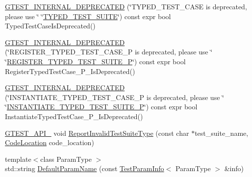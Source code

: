 \begin{DoxyCompactItemize}
\item 
\mbox{\hyperlink{namespacetesting_1_1internal_ac7c25a00ce37b8f6c7ea16814233b281}{G\+T\+E\+S\+T\+\_\+\+I\+N\+T\+E\+R\+N\+A\+L\+\_\+\+D\+E\+P\+R\+E\+C\+A\+T\+ED}} (\char`\"{}T\+Y\+P\+E\+D\+\_\+\+T\+E\+S\+T\+\_\+\+C\+A\+SE is deprecated, please use \char`\"{} \char`\"{}\mbox{\hyperlink{namespacetesting_a47a357ed1077c1b52ba654b7753714bc}{T\+Y\+P\+E\+D\+\_\+\+T\+E\+S\+T\+\_\+\+S\+U\+I\+TE}}\char`\"{}) const expr bool Typed\+Test\+Case\+Is\+Deprecated()
\item 
\mbox{\hyperlink{namespacetesting_1_1internal_ad10c37bd148fb8988a1d99e127891203}{G\+T\+E\+S\+T\+\_\+\+I\+N\+T\+E\+R\+N\+A\+L\+\_\+\+D\+E\+P\+R\+E\+C\+A\+T\+ED}} (\char`\"{}R\+E\+G\+I\+S\+T\+E\+R\+\_\+\+T\+Y\+P\+E\+D\+\_\+\+T\+E\+S\+T\+\_\+\+C\+A\+S\+E\+\_\+P is deprecated, please use \char`\"{} \char`\"{}\mbox{\hyperlink{namespacetesting_ac025be5150f4d250cfd8136063e2f2a1}{R\+E\+G\+I\+S\+T\+E\+R\+\_\+\+T\+Y\+P\+E\+D\+\_\+\+T\+E\+S\+T\+\_\+\+S\+U\+I\+T\+E\+\_\+P}}\char`\"{}) const expr bool Register\+Typed\+Test\+Case\+\_\+\+P\+\_\+\+Is\+Deprecated()
\item 
\mbox{\hyperlink{namespacetesting_1_1internal_ab9dabaaecfb36c469b3382a169a581db}{G\+T\+E\+S\+T\+\_\+\+I\+N\+T\+E\+R\+N\+A\+L\+\_\+\+D\+E\+P\+R\+E\+C\+A\+T\+ED}} (\char`\"{}I\+N\+S\+T\+A\+N\+T\+I\+A\+T\+E\+\_\+\+T\+Y\+P\+E\+D\+\_\+\+T\+E\+S\+T\+\_\+\+C\+A\+S\+E\+\_\+P is deprecated, please use \char`\"{} \char`\"{}\mbox{\hyperlink{namespacetesting_abc73aa914fde88c645367f862dbe81dd}{I\+N\+S\+T\+A\+N\+T\+I\+A\+T\+E\+\_\+\+T\+Y\+P\+E\+D\+\_\+\+T\+E\+S\+T\+\_\+\+S\+U\+I\+T\+E\+\_\+P}}\char`\"{}) const expr bool Instantiate\+Typed\+Test\+Case\+\_\+\+P\+\_\+\+Is\+Deprecated()
\item 
\mbox{\hyperlink{_obj__test_2lib_2googletest-release-1_88_81_2googletest_2include_2gtest_2internal_2gtest-port_8h_aa73be6f0ba4a7456180a94904ce17790}{G\+T\+E\+S\+T\+\_\+\+A\+P\+I\+\_\+}} void \mbox{\hyperlink{namespacetesting_1_1internal_abbc0c3f8d5ee67a39d26167138effbe8}{Report\+Invalid\+Test\+Suite\+Type}} (const char $\ast$test\+\_\+suite\+\_\+name, \mbox{\hyperlink{structtesting_1_1internal_1_1_code_location}{Code\+Location}} code\+\_\+location)
\item 
{\footnotesize template$<$class Param\+Type $>$ }\\std\+::string \mbox{\hyperlink{namespacetesting_1_1internal_a954ec4a8a932dac7743e77e459ffefdc}{Default\+Param\+Name}} (const \mbox{\hyperlink{structtesting_1_1_test_param_info}{Test\+Param\+Info}}$<$ Param\+Type $>$ \&info)
\item 

\end{DoxyCompactItemize}
